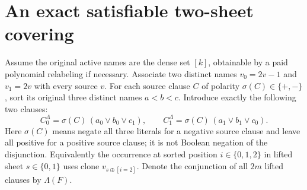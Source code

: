 \documentclass[11pt]{article}
\begin{document}
\section{An exact satisfiable two-sheet covering}
Assume the original active names are the dense set \([k]\), obtainable by a
paid polynomial relabeling if necessary.  Associate two distinct names
\(v_0=2v-1\) and \(v_1=2v\) with every source \(v\).
For each source clause \(C\) of polarity
\(\sigma(C)\in\{+,-\}\), sort its original three distinct names
\(a<b<c\). Introduce exactly the following two clauses:
\[
 C_0^\Lambda=\sigma(C)\,(a_0\vee b_0\vee c_1),
 \qquad
 C_1^\Lambda=\sigma(C)\,(a_1\vee b_1\vee c_0).
\]
Here \(\sigma(C)\) means negate all three literals for a negative source
clause and leave all positive for a positive source clause; it is not
Boolean negation of the disjunction.
Equivalently the occurrence at sorted position \(i\in\{0,1,2\}\)
in lifted sheet \(s\in\{0,1\}\) uses clone
\(v_{s\oplus[i=2]}\). Denote the conjunction of all
\(2m\) lifted clauses by \(\Lambda(F)\).
\end{document}
